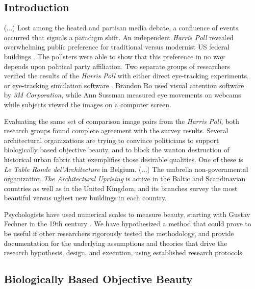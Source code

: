 \documentclass[a4paper]{article}
\begin{document}
\subsection{Introduction}

(...) Lost among the heated and partisan media debate, a confluence of events occurred that signals a paradigm shift. An independent \textit{Harris Poll} revealed overwhelming public preference for traditional versus modernist US federal buildings \cite{noauthor_americans_2020}. The pollsters were able to show that this preference in no way depends upon political party affiliation. Two separate groups of researchers verified the results of the \textit{Harris Poll} with either direct eye-tracking experiments, or eye-tracking simulation software \cite{huffman_modern_2022}\cite{design_study-1_2022}. Brandon Ro used visual attention software by \textit{3M Corporation}, while Ann Sussman measured eye movements on webcams while subjects viewed the images on a computer screen.

Evaluating the same set of comparison image pairs from the \textit{Harris Poll}, both research groups found complete agreement with the survey results. Several architectural organizations are trying to convince politicians to support biologically based objective beauty, and to block the wanton destruction of historical urban fabric that exemplifies those desirable qualities. One of these is \textit{Le Table Ronde del'Architecture} in Belgium. (...) The umbrella non-governmental organization \textit{The Architectural Uprising} is active in the Baltic and Scandinavian countries as well as in the United Kingdom, and its branches survey the most beautiful versus ugliest new buildings in each country.

Psychologists have used numerical scales to measure beauty, starting with Gustav Fechner in the 19th century \cite{brielmann_intense_2019}. We have hypothesized a method that could prove to be useful if other researchers rigorously tested the methodology, and provide documentation for the underlying assumptions and theories that drive the research hypothesis, design, and execution, using established research protocols.

\subsection{Biologically Based Objective Beauty}
\end{document}
